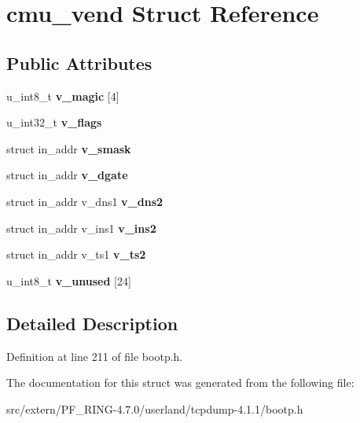 \hypertarget{structcmu__vend}{
\section{cmu\_\-vend Struct Reference}
\label{structcmu__vend}
}
\subsection*{Public Attributes}
\begin{DoxyCompactItemize}
\item 
\hypertarget{structcmu__vend_a48de8b3c70d48a701fa7c71c89b8b263}{
u\_\-int8\_\-t {\bfseries v\_\-magic} \mbox{[}4\mbox{]}}
\label{structcmu__vend_a48de8b3c70d48a701fa7c71c89b8b263}

\item 
\hypertarget{structcmu__vend_ac0840b7b86983425728f10b5aa84b0a2}{
u\_\-int32\_\-t {\bfseries v\_\-flags}}
\label{structcmu__vend_ac0840b7b86983425728f10b5aa84b0a2}

\item 
\hypertarget{structcmu__vend_a264b304650b2c819642d3d8f8ffcbb74}{
struct in\_\-addr {\bfseries v\_\-smask}}
\label{structcmu__vend_a264b304650b2c819642d3d8f8ffcbb74}

\item 
\hypertarget{structcmu__vend_a379cccd5c2c56e45fb82526642c69dc1}{
struct in\_\-addr {\bfseries v\_\-dgate}}
\label{structcmu__vend_a379cccd5c2c56e45fb82526642c69dc1}

\item 
\hypertarget{structcmu__vend_aa753813fa224650353b05500add71843}{
struct in\_\-addr v\_\-dns1 {\bfseries v\_\-dns2}}
\label{structcmu__vend_aa753813fa224650353b05500add71843}

\item 
\hypertarget{structcmu__vend_a94d944d43630e95a59860d04690969ed}{
struct in\_\-addr v\_\-ins1 {\bfseries v\_\-ins2}}
\label{structcmu__vend_a94d944d43630e95a59860d04690969ed}

\item 
\hypertarget{structcmu__vend_af9fc39eaaa9adb52b8eda4388c980dd3}{
struct in\_\-addr v\_\-ts1 {\bfseries v\_\-ts2}}
\label{structcmu__vend_af9fc39eaaa9adb52b8eda4388c980dd3}

\item 
\hypertarget{structcmu__vend_aa7be2d5d25b1869458f75f7f378c159d}{
u\_\-int8\_\-t {\bfseries v\_\-unused} \mbox{[}24\mbox{]}}
\label{structcmu__vend_aa7be2d5d25b1869458f75f7f378c159d}

\end{DoxyCompactItemize}


\subsection{Detailed Description}


Definition at line 211 of file bootp.h.



The documentation for this struct was generated from the following file:\begin{DoxyCompactItemize}
\item 
src/extern/PF\_\-RING-\/4.7.0/userland/tcpdump-\/4.1.1/bootp.h\end{DoxyCompactItemize}
